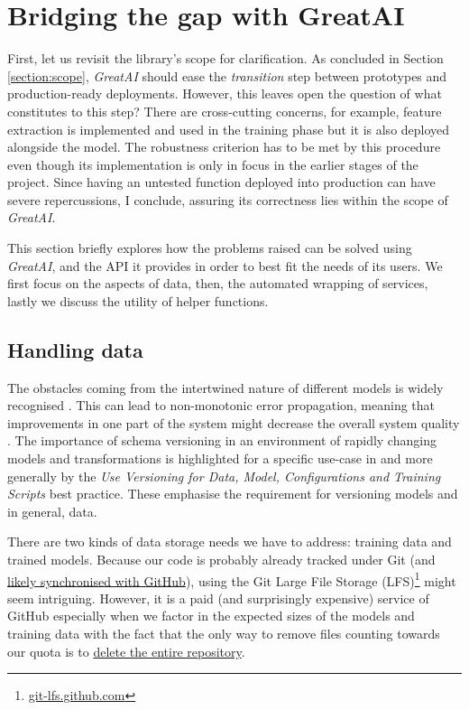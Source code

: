\section{Bridging the gap with GreatAI}

First, let us revisit the library's scope for clarification. As concluded in Section \ref{section:scope}, \textit{GreatAI} should ease the \textit{transition} step between prototypes and production-ready deployments. However, this leaves open the question of what constitutes to this step? There are cross-cutting concerns, for example, feature extraction is implemented and used in the training phase but it is also deployed alongside the model. The robustness criterion has to be met by this procedure even though its implementation is only in focus in the earlier stages of the project. Since having an untested function deployed into production can have severe repercussions, I conclude, assuring its correctness lies within the scope of \textit{GreatAI}.

This section briefly explores how the problems raised can be solved using \textit{GreatAI}, and the API it provides in order to best fit the needs of its users. We first focus on the aspects of data, then, the automated wrapping of services, lastly we discuss the utility of helper functions.

\subsection{Handling data} \label{subsection:large-file}

The obstacles coming from the intertwined nature of different models is widely recognised \cite{haakman2021ai,amershi2019software,sculley2015hidden}. This can lead to non-monotonic error propagation, meaning that improvements in one part of the system might decrease the overall system quality \cite{amershi2019software}. The importance of schema versioning in an environment of rapidly changing models and transformations is highlighted for a specific use-case in \cite{van2017versioning} and more generally by the \textit{Use Versioning for Data, Model, Configurations and Training Scripts} best practice. These emphasise the requirement for versioning models and in general, data.

There are two kinds of data storage needs we have to address: training data and trained models. Because our code is probably already tracked under Git (and \href{https://octoverse.github.com/#lets-look-back-at-the-code-and-communities-built-on-git-hub-this-year}{likely synchronised with GitHub}), using the Git Large File Storage (LFS)\footnote{\href{https://git-lfs.github.com/}{git-lfs.github.com}} might seem intriguing. However, it is a paid (and surprisingly expensive) service of GitHub especially when we factor in the expected sizes of the models and training data with the fact that the only way to remove files counting towards our quota is to \href{https://docs.github.com/en/repositories/working-with-files/managing-large-files/removing-files-from-git-large-file-storage#git-lfs-objects-in-your-repository}{delete the entire repository}.

